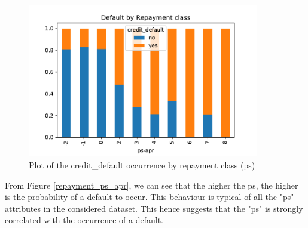 \documentclass[a4paper]{article}
\begin{document}
\begin{center}
\begin{figure}
\includegraphics[width=0.9\textwidth]{../Code/Daniele/Plots/credit_default_ps_apr.pdf}
\caption{Plot of the credit\_default occurrence by repayment class (ps)}
\label{fig:repayment_ps_apr}
\end{figure}
\end{center}


From Figure \ref{repayment_ps_apr}, we can see that the higher the ps, the higher is the probability of a default to occur. This behaviour is typical of all the "ps" attributes in the considered dataset. This hence suggests that the "ps" is strongly correlated with the occurrence of a default. 


	
    
    
    















\end{document}
